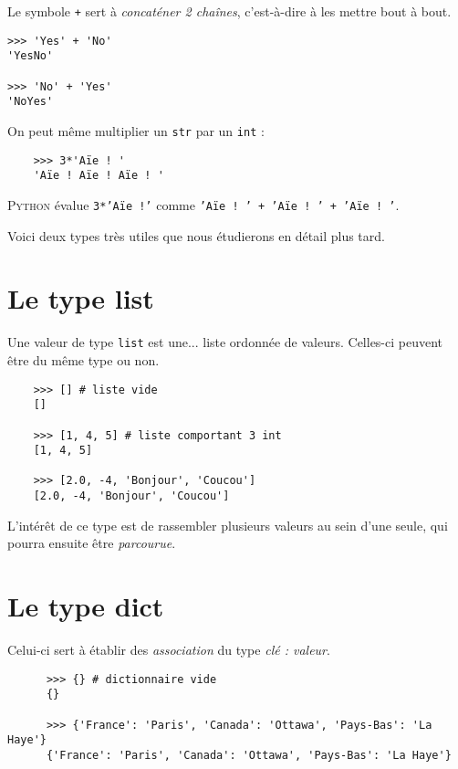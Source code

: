 Le symbole \texttt{+} sert à \textit{concaténer 2 chaînes}, c'est-à-dire à les mettre bout à bout.  

\begin{pyc}\begin{verbatim}
>>> 'Yes' + 'No'
'YesNo'

>>> 'No' + 'Yes'
'NoYes'
\end{verbatim}
\end{pyc}

On peut même multiplier un \texttt{str} par un \texttt{int} :
\begin{pyc}
  \begin{verbatim}
    >>> 3*'Aïe ! '
    'Aïe ! Aïe ! Aïe ! '
  \end{verbatim}
\end{pyc}
\textsc{Python} évalue \texttt{3*'Aïe !'} comme \texttt{'Aïe ! ' + 'Aïe ! ' + 'Aïe ! '}.


Voici deux types très utiles que nous étudierons en détail plus tard.

\section{Le type list}

Une valeur de type \texttt{list} est une... liste ordonnée de valeurs. Celles-ci peuvent être du même type ou non.

\begin{pyc}
  \begin{verbatim}
    >>> [] # liste vide
    []

    >>> [1, 4, 5] # liste comportant 3 int
    [1, 4, 5]

    >>> [2.0, -4, 'Bonjour', 'Coucou']
    [2.0, -4, 'Bonjour', 'Coucou']
  \end{verbatim}
\end{pyc}

L'intérêt de ce type est de rassembler plusieurs valeurs au sein d'une seule, qui pourra ensuite être \textit{parcourue}.

\section{Le type dict}

Celui-ci sert à établir des \textit{association} du type \textit{clé : valeur}.

\begin{pyc}
    \begin{verbatim}
      >>> {} # dictionnaire vide
      {}

      >>> {'France': 'Paris', 'Canada': 'Ottawa', 'Pays-Bas': 'La Haye'}
      {'France': 'Paris', 'Canada': 'Ottawa', 'Pays-Bas': 'La Haye'}
    \end{verbatim}
  \end{pyc}  

